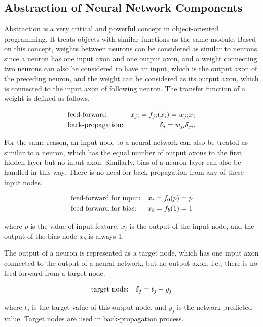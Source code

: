 \documentclass[procedia]{easychair}
\begin{document}
\subsection{Abstraction of Neural Network Components}

Abstraction is a very critical and powerful concept in object-oriented programming.  It treats objects with similar functions as the same module.  Based on this concept, weights between neurons can be considered as similar to neurons, since a neuron has one input axon and one output axon, and a weight connecting two neurons can also be considered to have an input, which is the output axon of the preceding neuron, and the weight can be considered as its output axon, which is connected to the input axon of following neuron.  The transfer function of a weight is defined as follows,

\begin{align}
    & \text{feed-forward:} & x_{ji} = f_{ji}(x_i) = w_{ji}x_i \notag \\
    & \text{back-propagation:} & \delta_j = w_{ji}\delta_{ji} \text{.} \notag
\end{align}

For the same reason, an input node to a neural network can also be treated as similar to a neuron, which has the equal number of output axons to the first hidden layer but no input axon.  Similarly, bias of a neuron layer can also be handled in this way.  There is no need for back-propagation from any of these input nodes.

\begin{align}
	& \text{feed-forward for input:} & x_i = f_0(p) = p \notag \\
	& \text{feed-forward for bias:} & x_b = f_b(1) = 1 \notag
\end{align}

where $p$ is the value of input feature, $x_i$ is the output of the input node, and the output of the bias node $x_b$ is always 1.

The output of a neuron is represented as a target node, which has one input axon connected to the output of a neural network, but no output axon, i.e., there is no feed-forward from a target node.

\begin{align}
    & \text{target node:} & \delta_j = t_j - y_j \notag
\end{align}

where $t_j$ is the target value of this output node, and $y_j$ is the network predicted value.  Target nodes are used in back-propagation process.
\end{document}
